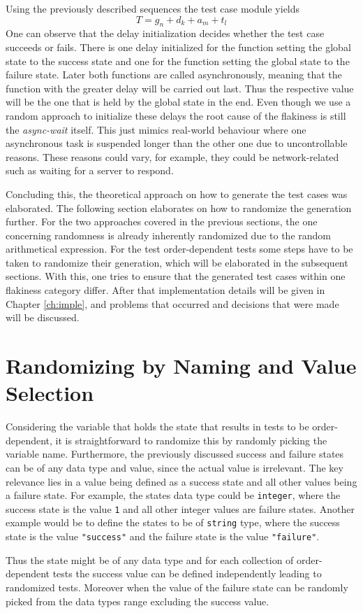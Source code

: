 \documentclass[
fancyheadings, %
%
%
]{stsreprt}
\begin{document}
Using the previously described sequences the test case module yields 
\[
    T = g_n + d_k + a_m + t_l
\]
One can observe that the delay initialization decides whether the test case succeeds or fails. 
There is one delay initialized for the function setting the global state to the success state and one for the function setting the global state to the failure state. 
Later both functions are called asynchronously, meaning that the function with the greater delay will be carried out last.
Thus the respective value will be the one that is held by the global state in the end. 
Even though we use a random approach to initialize these delays the root cause of the flakiness is still the \textit{async-wait} itself.
This just mimics real-world behaviour where one asynchronous task is suspended longer than the other one due to uncontrollable reasons. 
These reasons could vary, for example, they could be network-related such as waiting for a server to respond. \par
Concluding this, the theoretical approach on how to generate the test cases was elaborated. 
The following section elaborates on how to randomize the generation further. 
For the two approaches covered in the previous sections, the one concerning randomness is already inherently randomized due to the random arithmetical expression. 
For the test order-dependent tests some steps have to be taken to randomize their generation, which will be elaborated in the subsequent sections. 
With this, one tries to ensure that the generated test cases within one flakiness category differ. 
After that implementation details will be given in Chapter \ref{ch:imple}, and problems that occurred and decisions that were made will be discussed. \par

\section{Randomizing by Naming and Value Selection}
Considering the variable that holds the state that results in tests to be order-dependent, it is straightforward to randomize this by randomly picking the variable name. 
Furthermore, the previously discussed success and failure states can be of any data type and value, since the actual value is irrelevant. 
The key relevance lies in a value being defined as a success state and all other values being a failure state.
For example, the states data type could be \texttt{integer}, where the success state is the value \texttt{1} and all other integer values are failure states. 
Another example would be to define the states to be of \texttt{string} type, where the success state is the value \texttt{"success"} and the failure state is the value \texttt{"failure"}. \par
Thus the state might be of any data type and for each collection of order-dependent tests the success value can be defined independently leading to randomized tests. 
Moreover when the value of the failure state can be randomly picked from the data types range excluding the success value. 
\end{document}
